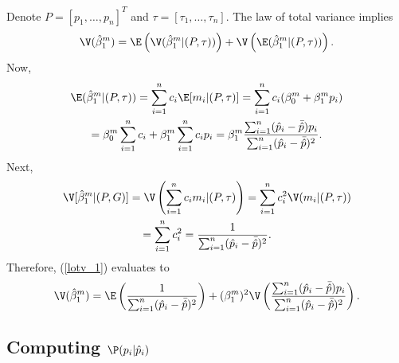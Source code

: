 \documentclass[12pt]{article}
\begin{document}
Denote $P = [p_1, \dots, p_n ]^T$ and $\tau = [\tau_1, \dots, \tau_n]$. The law of total variance implies
\begin{equation}\label{lotv_1}
\V( \hat{\beta}^m_1 )  = \E \left( \V ( \hat{\beta}^m_1 | (P, \tau) ) \right) + \V \left(\E(\hat{\beta}^m_1 | (P, \tau))\right) .
\end{equation}
Now,
\begin{multline}\label{exp_1}
\E(\hat{\beta}^m_1 |(P, \tau)) = \sum_{i=1}^n c_i \E[m_i | (P,\tau)] =\sum_{i=1}^n c_i (\beta^m_0 + \beta^m_1 p_i) \\ = \beta^m_0 \sum_{i=1}^n c_i + \beta^m_1 \sum_{i=1}^n c_i p_i = \beta^m_1 \frac{ \sum_{i=1}^n (\hat{p}_i - \bar{\hat{p}} ) p_i}{ \sum_{i=1}^n (\hat{p}_i - \bar{\hat{p}})^2}.
\end{multline}
Next,
\begin{multline}\label{var_1}
\V[\hat{\beta}^m_1 | (P, G)] = \V\left( \sum_{i=1}^n c_i m_i | (P, \tau) \right) = \sum_{i=1}^n c_i^2 \V(m_i | (P, \tau)) \\ = \sum_{i=1}^n c^2_i = \frac{ 1 }{ \sum_{i=1}^n (\hat{p}_i - \bar{\hat{p}})^2}.\end{multline}
Therefore, (\ref{lotv_1}) evaluates to
\begin{equation}\label{var_2}
 \V(\hat{\beta}^m_1) = \E\left( \frac{ 1 }{ \sum_{i=1}^n (\hat{p}_i - \bar{\hat{p}})^2} \right) + (\beta^m_1)^2 \V \left( \frac{ \sum_{i=1}^n (\hat{p}_i - \bar{\hat{p}} ) p_i}{ \sum_{i=1}^n (\hat{p}_i - \bar{\hat{p}})^2}\right).
 \end{equation}

\subsection{Computing $\P(p_i |\hat{p}_i)$}
\end{document}
